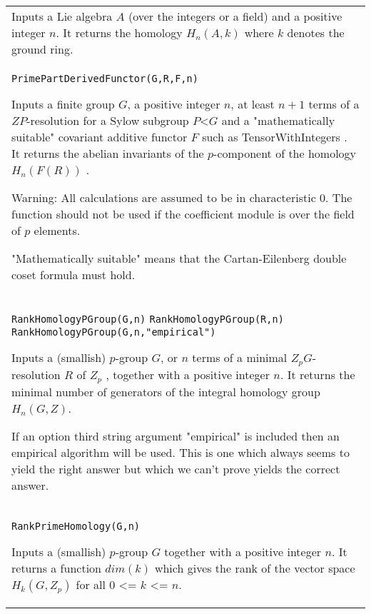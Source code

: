 \documentclass[a4paper,11pt]{report}
\begin{document}
{\begin{center}
\begin{tabular}{|l|}
 Inputs a Lie algebra $A$ (over the integers or a field) and a positive integer $n$. It returns the homology $H_n(A,k)$ where $k$ denotes the ground ring. \\
 \index{PrimePartDerivedFunctor} \texttt{PrimePartDerivedFunctor(G,R,F,n)} 

 Inputs a finite group $G$, a positive integer $n$, at least $n+1$ terms of a $ZP$-resolution for a Sylow subgroup $P${\textless}$G$ and a "mathematically suitable" covariant additive functor $F$ such as TensorWithIntegers . It returns the abelian invariants of the $p$-component of the homology $H_n(F(R))$ . 

 Warning: All calculations are assumed to be in characteristic 0. The function
should not be used if the coefficient module is over the field of $p$ elements. 

 "Mathematically suitable" means that the Cartan-Eilenberg double coset formula
must hold. \\
 \index{RankHomologyPGroup} \texttt{RankHomologyPGroup(G,n)} \texttt{RankHomologyPGroup(R,n)} \texttt{RankHomologyPGroup(G,n,"empirical")} 

 Inputs a (smallish) $p$-group $G$, or $n$ terms of a minimal $Z_pG$-resolution $R$ of $Z_p$ , together with a positive integer $n$. It returns the minimal number of generators of the integral homology group $H_n(G,Z)$. 

 If an option third string argument "empirical" is included then an empirical
algorithm will be used. This is one which always seems to yield the right
answer but which we can't prove yields the correct answer. \\
 \index{RankPrimeHomology} \texttt{RankPrimeHomology(G,n)} 

 Inputs a (smallish) $p$-group $G$ together with a positive integer $n$. It returns a function $dim(k)$ which gives the rank of the vector space $H_k(G,Z_p)$ for all $0$ {\textless}= $k$ {\textless}= $n$. \\
\end{tabular}\\[2mm]
\end{center}

 }

 
\end{document}
